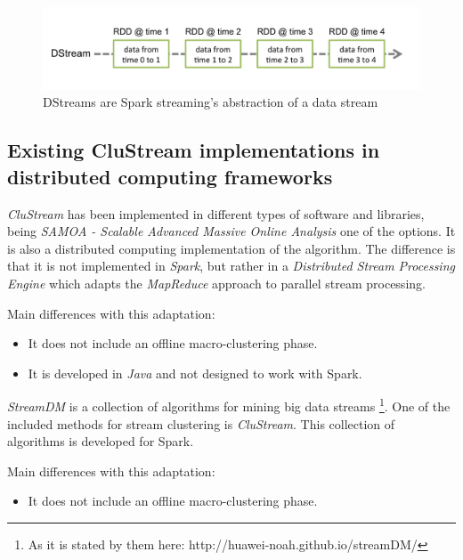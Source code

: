 \begin{figure}[h!]
 \centering
 \includegraphics[scale=0.45]{./styles/streaming-dstream.png}
 \caption{DStreams are Spark streaming's abstraction of a data stream}
 \label{fig:dstream}
\end{figure}




\subsection{Existing CluStream implementations in distributed computing frameworks}
\textit{CluStream} has been implemented in different types of software and libraries, being \textit{SAMOA - Scalable Advanced Massive Online Analysis} one of the options. It is also a distributed computing implementation of the algorithm. The difference is that it is not implemented in \textit{Spark}, but rather in a \textit{Distributed Stream Processing Engine} which adapts the \textit{MapReduce} approach to parallel stream processing\cite{samoa}.

Main differences with this adaptation: 

\begin{itemize}
 \item It does not include an offline macro-clustering phase.
 \item It is developed in \textit{Java} and not designed to work with Spark.
\end{itemize}

\textit{StreamDM} is a collection of algorithms for mining big data streams \footnote{As it is stated by them here: http://huawei-noah.github.io/streamDM/}. One of the included methods for stream clustering is \textit{CluStream}. This collection of algorithms is developed for Spark.

Main differences with this adaptation: 

\begin{itemize}
 \item It does not include an offline macro-clustering phase.
\end{itemize}